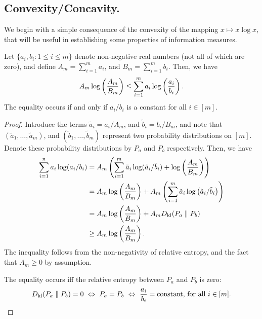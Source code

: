             
            \subsection{Convexity/Concavity.}
           
            We begin with a simple consequence of the convexity of the mapping $x \mapsto x \log x$, that will be useful in establishing some properties of information measures. 
                \begin{proposition}
                    \label{prop:log-sum}                    
                    Let $\{a_i, b_i: 1 \leq i \leq m\}$ denote non-negative real numbers (not all of which are zero), and define $A_m = \sum_{i=1}^m a_i$, and $B_m = \sum_{i=1}^m b_i$. Then, we have 
                    \begin{align}
                        A_m \log \left( \frac{A_m}{B_m} \right) \leq \sum_{i=1}^m a_i \log\left( \frac{a_i}{b_i} \right).  
                    \end{align}
                    The equality occurs if and only if $a_i/b_i$ is a constant for all $i \in [m]$. 
                \end{proposition}
                \begin{proof}
                    Introduce the terms $\tilde{a}_i = a_i/A_m$, and $\tilde{b}_i = b_i/B_m$, and note that $(\tilde{a}_1, \ldots, \tilde{a}_m)$, and $(\tilde{b}_1, \ldots, \tilde{b}_m)$ represent two probability distributions on $[m]$. Denote these probability distributions by $P_a$ and $P_b$ respectively. Then, we have 
                    \begin{align}
                        \sum_{i=1}^n a_i \log (a_i/b_i) &= A_m \left( \sum_{i=1}^m \tilde{a}_i \log (\tilde{a}_i/\tilde{b}_i) + \log\left( \frac{A_m}{B_m} \right)  \right) \\
                        & = A_m \log \left( \frac{A_m}{B_m} \right)  + A_m \left( \sum_{i=1}^m \tilde{a}_i \log \left( \tilde{a}_i/\tilde{b}_i \right) \right)  \\
                        & = A_m \log \left( \frac{A_m}{B_m} \right)  + A_m D_{\text{kl}}(P_a \parallel P_b)\\
                        & \geq A_m \log \left( \frac{A_m}{B_m} \right). 
                    \end{align}
                    The inequality follows from the non-negativity of relative entropy, and the fact that $A_m \geq 0$ by assumption. 

                    The equality occurs iff the relative entropy between $P_a$ and $P_b$ is zero: 
                    \begin{align}
                        D_{\text{kl}}(P_a \parallel P_b) = 0 ~\Leftrightarrow~ P_a = P_b ~\Leftrightarrow~ \frac{a_i}{b_i} = \text{constant, for all } i \in [m]. 
                    \end{align}
                \end{proof}
